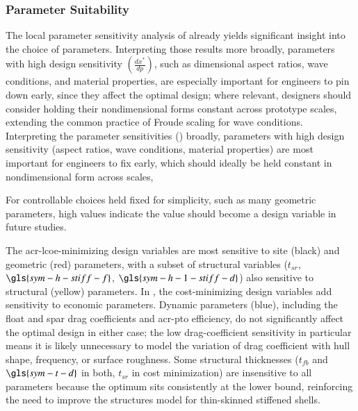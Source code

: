 \subsubsection{Parameter Suitability}
\ifdefined\DISSERTATION
    The local parameter sensitivity analysis of  already yields significant insight into the choice of parameters.
    Interpreting those results more broadly, parameters with high design sensitivity $\left(\frac{dx^*}{dp}\right)$, such as dimensional aspect ratios, wave conditions, and material properties, are especially important for engineers to pin down early, since they affect the optimal design; where relevant, designers should consider holding their nondimensional forms constant across prototype scales, extending the common practice of Froude scaling for wave conditions.
\else
    Interpreting the parameter sensitivities () broadly, parameters with high design sensitivity (aspect ratios, wave conditions, material properties) are most important for engineers to fix early,
    which should ideally be held constant in nondimensional form across scales,
\fi

\ifdefined\DISSERTATION
    
    For controllable choices held fixed for simplicity, such as many geometric parameters, high values indicate the value should become a design variable in future studies.
    
    The \gls{acr-lcoe}-minimizing design variables are most sensitive to site (black) and geometric (red) parameters, with a subset of structural variables ($t_{sr}$, $\gls{sym-h-stiff-f}$, $\gls{sym-h-1-stiff-d}$) also sensitive to structural (yellow) parameters.
    In , the cost-minimizing design variables add sensitivity to economic parameters.
    Dynamic parameters (blue), including the float and spar drag coefficients and \gls{acr-pto} efficiency, do not significantly affect the optimal design in either case; the low drag-coefficient sensitivity in particular means it is likely unnecessary to model the variation of drag coefficient with hull shape, frequency, or surface roughness.
    Some structural thicknesses ($t_{fb}$ and $\gls{sym-t-d}$ in both, $t_{sr}$ in cost minimization) are insensitive to all parameters because the optimum sits consistently at the lower bound, reinforcing the need to improve the structures model for thin-skinned stiffened shells.
    
